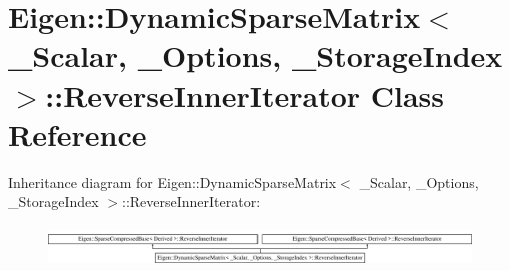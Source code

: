 \hypertarget{class_eigen_1_1_dynamic_sparse_matrix_1_1_reverse_inner_iterator}{}\section{Eigen\+:\+:Dynamic\+Sparse\+Matrix$<$ \+\_\+\+Scalar, \+\_\+\+Options, \+\_\+\+Storage\+Index $>$\+:\+:Reverse\+Inner\+Iterator Class Reference}
\label{class_eigen_1_1_dynamic_sparse_matrix_1_1_reverse_inner_iterator}
Inheritance diagram for Eigen\+:\+:Dynamic\+Sparse\+Matrix$<$ \+\_\+\+Scalar, \+\_\+\+Options, \+\_\+\+Storage\+Index $>$\+:\+:Reverse\+Inner\+Iterator\+:\begin{figure}[H]
\begin{center}
\leavevmode
\includegraphics[height=1.074856cm]{class_eigen_1_1_dynamic_sparse_matrix_1_1_reverse_inner_iterator}
\end{center}
\end{figure}
